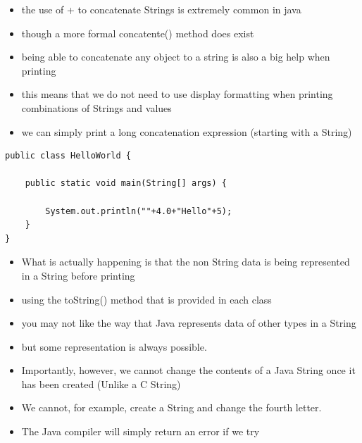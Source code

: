 \documentclass{beamer}
\begin{document}
\begin{frame}[fragile]
\begin{itemize}
\item the use of + to concatenate Strings is extremely common in java
\item though a more formal concatente() method does exist
\item being able to concatenate any object to a string is also a big help when printing
\item this means that we do not need to use display formatting when printing combinations of Strings and values
\item we can simply print a long concatenation expression (starting with a String)
\end{itemize}
\begin{block}{}
\begin{lstlisting}
public class HelloWorld {

    public static void main(String[] args) {
    
        System.out.println(""+4.0+"Hello"+5);
    }
} 
\end{lstlisting}
\end{block}
\end{frame}

\begin{frame}
\begin{itemize}
\item What is actually happening is that the non String data is being represented in a String before printing
\item using the toString() method that is provided in each class
\item you may not like the way that Java represents data of other types in a String
\item but some representation is always possible. 
\end{itemize}
\end{frame}

\begin{frame}
\begin{itemize}
\item Importantly, however, we cannot change the contents of a Java String once it has been created (Unlike a C String)
\item We cannot, for example, create a String and change the fourth letter.
\item The Java compiler will simply return an error if we try
\end{itemize}
\end{frame}
\end{document}
